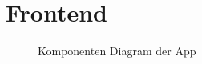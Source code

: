 \section{Frontend}
\label{sec:frontend}

\begin{figure}
    \centering
    
    \caption{Komponenten Diagram der \shst{} App}
    \label{fig:ss-app-class-diagram}
\end{figure}





